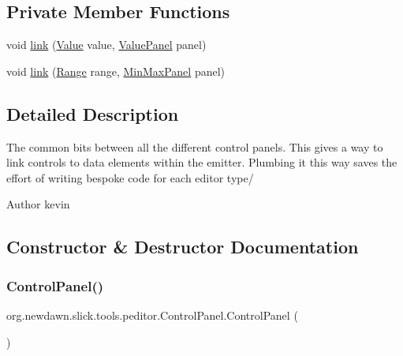 \subsection*{Private Member Functions}
\begin{DoxyCompactItemize}
\item 
void \mbox{\hyperlink{classorg_1_1newdawn_1_1slick_1_1tools_1_1peditor_1_1_control_panel_af5b325d2af82547dd9b9392c0bfe8a15}{link}} (\mbox{\hyperlink{interfaceorg_1_1newdawn_1_1slick_1_1particles_1_1_configurable_emitter_1_1_value}{Value}} value, \mbox{\hyperlink{classorg_1_1newdawn_1_1slick_1_1tools_1_1peditor_1_1_value_panel}{Value\+Panel}} panel)
\item 
void \mbox{\hyperlink{classorg_1_1newdawn_1_1slick_1_1tools_1_1peditor_1_1_control_panel_a4a70b9150db9b78be6708a393549efc3}{link}} (\mbox{\hyperlink{classorg_1_1newdawn_1_1slick_1_1particles_1_1_configurable_emitter_1_1_range}{Range}} range, \mbox{\hyperlink{classorg_1_1newdawn_1_1slick_1_1tools_1_1peditor_1_1_min_max_panel}{Min\+Max\+Panel}} panel)
\end{DoxyCompactItemize}


\subsection{Detailed Description}
The common bits between all the different control panels. This gives a way to link controls to data elements within the emitter. Plumbing it this way saves the effort of writing bespoke code for each editor type/

\begin{DoxyAuthor}{Author}
kevin 
\end{DoxyAuthor}


\subsection{Constructor \& Destructor Documentation}
\mbox{\label{classorg_1_1newdawn_1_1slick_1_1tools_1_1peditor_1_1_control_panel_ad200a221101890f1d49dd45e48e70a33}} 
\subsubsection{\texorpdfstring{Control\+Panel()}{ControlPanel()}}
{\footnotesize\ttfamily org.\+newdawn.\+slick.\+tools.\+peditor.\+Control\+Panel.\+Control\+Panel (\begin{DoxyParamCaption}{ }\end{DoxyParamCaption})\hspace{0.3cm}{\ttfamily [inline]}}

